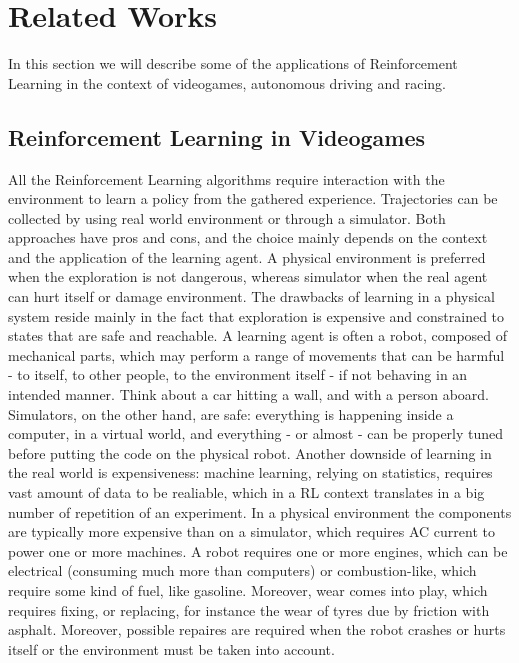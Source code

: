 \section{Related Works}



In this section we will describe some of the applications of Reinforcement Learning in the context of videogames, autonomous driving and racing. 


\subsection{Reinforcement Learning in Videogames}

All the Reinforcement Learning algorithms require interaction with the environment to learn a policy from the gathered experience. Trajectories can be collected by using real world environment or through a simulator. 
Both approaches have pros and cons, and the choice mainly depends on the context and the application of the learning agent. 
A physical environment is preferred when the exploration is not dangerous, whereas simulator when the real agent can hurt itself or damage environment. 
The drawbacks of learning in a physical system reside mainly in the fact that exploration is expensive and constrained to states that are safe and reachable. A learning agent is often a robot, composed of mechanical parts, which may perform a range of movements that can be harmful - to itself, to other people, to the environment itself - if not behaving in an intended manner. Think about a car hitting a wall, and with a person aboard. Simulators, on the other hand, are safe: everything is happening inside a computer, in a virtual world, and everything - or almost - can be properly tuned before putting the code on the physical robot. Another downside of learning in the real world is expensiveness: machine learning, relying on statistics, requires vast amount of data to be realiable, which in a RL context translates in a big number of repetition of an experiment. In a physical environment the components are typically more expensive than on a simulator, which requires AC current to power one or more machines. A robot requires one or more engines, which can be electrical (consuming much more than computers) or combustion-like, which require some kind of fuel, like gasoline. Moreover, wear comes into play, which requires fixing, or replacing, for instance the wear of tyres due by friction with asphalt.  Moreover, possible repaires are required when the robot crashes or hurts itself or the environment must be taken into account. 
